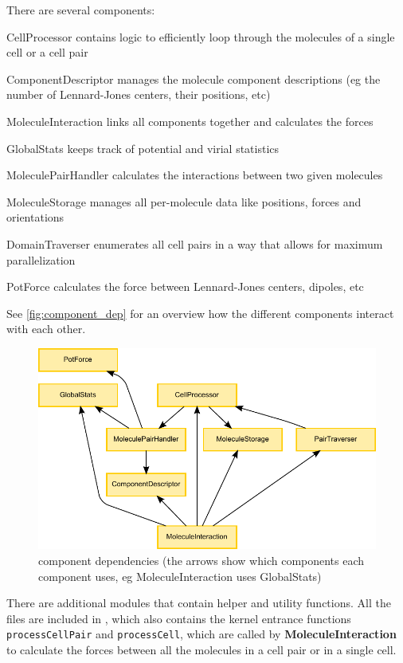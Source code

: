 There are several components:
\begin{compactdesc}
\item[CellProcessor] contains logic to efficiently loop through the molecules of a single cell or a cell pair
\item[ComponentDescriptor] manages the molecule component descriptions (eg the number of Lennard-Jones centers, their positions, etc)
\item[MoleculeInteraction] links all components together and calculates the forces
\item[GlobalStats] keeps track of potential and virial statistics
\item[MoleculePairHandler] calculates the interactions between two given molecules
\item[MoleculeStorage] manages all per-molecule data like positions, forces and orientations
\item[DomainTraverser] enumerates all cell pairs in a way that allows for maximum parallelization
\item[PotForce] calculates the force between Lennard-Jones centers, dipoles, etc
\end{compactdesc}
See \autoref{fig:component_dep} for an overview how the different components interact with each other.

\begin{figure}
\centering
\includegraphics{figures/component_dependencies.pdf}
\caption{component dependencies (the arrows show which components each component uses, eg MoleculeInteraction uses GlobalStats)}
\label{fig:component_dep}
\end{figure}

There are additional \cuda{} modules that contain helper and utility functions.
All the  files are included in , which also contains the kernel entrance functions \lstinline!processCellPair! and \lstinline!processCell!, which are called by \textbf{MoleculeInteraction} to calculate the forces between all the molecules in a cell pair or in a single cell.

